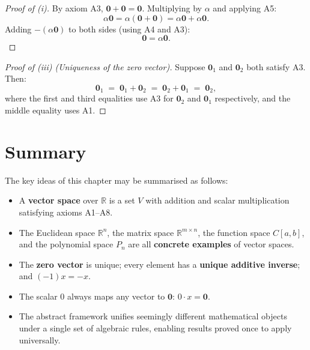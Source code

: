 \documentclass[12pt,a4paper]{article}
\newcommand{\R}{\mathbb{R}}
\newcommand{\vzero}{\mathbf{0}}
\begin{document}
\begin{proof}[Proof of (i)]
  By axiom A3, $\vzero + \vzero = \vzero$.  Multiplying by $\alpha$ and applying
  A5:
  \[
    \alpha\vzero = \alpha(\vzero + \vzero) = \alpha\vzero + \alpha\vzero.
  \]
  Adding $-(\alpha\vzero)$ to both sides (using A4 and A3):
  \[
    \vzero = \alpha\vzero.
  \]
\end{proof}

\begin{proof}[Proof of (iii) (Uniqueness of the zero vector)]
  Suppose $\vzero_1$ and $\vzero_2$ both satisfy A3.  Then:
  \[
    \vzero_1 \;=\; \vzero_1 + \vzero_2 \;=\; \vzero_2 + \vzero_1 \;=\; \vzero_2,
  \]
  where the first and third equalities use A3 for $\vzero_2$ and $\vzero_1$
  respectively, and the middle equality uses A1.
\end{proof}

\section{Summary}

The key ideas of this chapter may be summarised as follows:

\begin{tcolorbox}[
  enhanced, colback=shadeyellow, colframe=orange!70!black,
  title={\bfseries Chapter Summary}, fonttitle=\bfseries, breakable
]
\begin{itemize}[leftmargin=1.5em, itemsep=0.5em]
  \item A \textbf{vector space} over $\R$ is a set $V$ with addition and scalar
        multiplication satisfying axioms A1--A8.
  \item The Euclidean space $\R^n$, the matrix space $\R^{m\times n}$, the
        function space $C[a,b]$, and the polynomial space $P_n$ are all
        \textbf{concrete examples} of vector spaces.
  \item The \textbf{zero vector} is unique; every element has a \textbf{unique
        additive inverse}; and $(-1)x = -x$.
  \item The scalar $0$ always maps any vector to $\vzero$:
        $0\cdot x = \vzero$.
  \item The abstract framework unifies seemingly different mathematical objects
        under a single set of algebraic rules, enabling results proved once to
        apply universally.
\end{itemize}
\end{tcolorbox}

\end{document}
